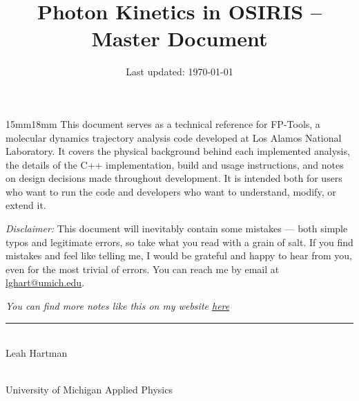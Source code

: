 
\date{}




\title{Photon Kinetics in OSIRIS -- Master Document\vspace{-2.5em}}

\maketitle
\thispagestyle{empty}

\begin{adjustwidth}{15mm}{18mm}
\hspace{1.4em} This document serves as a technical reference for FP-Tools, a
molecular dynamics trajectory analysis code developed at Los Alamos National
Laboratory. It covers the physical background behind each implemented analysis, 
the details of the C++ implementation, build and usage instructions, and notes
on design decisions made throughout development. It is intended both for users
who want to run the code and developers who want to understand, modify, or
extend it.

\hspace{1.4em}\textit{Disclaimer:} This document will inevitably contain some 
mistakes ---  both simple typos and legitimate errors, so take what you read
with a grain of salt. If you find mistakes and feel like telling me, I would be
grateful and happy to hear from you, even for the most trivial of errors. You 
can reach me by email at \href{mailto:lghart@umich.edu}{lghart@umich.edu}.
\end{adjustwidth}
\vspace{10.5cm}
\begin{center}
        \textit{You can find more notes like this on my website \href{https://leahghartman.github.io/academics/}{here}}
        \rule{0.75\textwidth}{0.5pt} \\
        Leah Hartman \\
        \date{\normalsize Last updated: \today} \\
        University of Michigan Applied Physics
\end{center}

\newpage
\tableofcontents\label{sec:contents}














